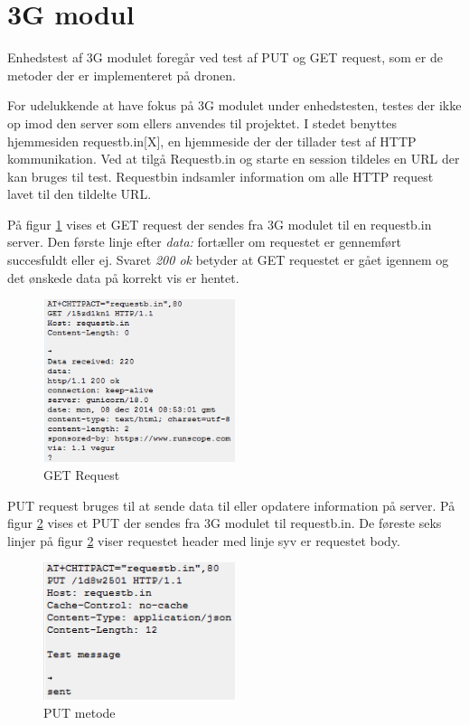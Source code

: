\section{3G modul}

Enhedstest af 3G modulet foregår ved test af PUT og GET request, som er de metoder der er implementeret på dronen.

For udelukkende at have fokus på 3G modulet under enhedstesten, testes der ikke op imod den server som ellers anvendes til projektet. I stedet benyttes hjemmesiden requestb.in[X], en hjemmeside der der tillader test af HTTP kommunikation. Ved at tilgå Requestb.in og starte en session tildeles en URL der kan bruges til test. Requestbin indsamler information om alle HTTP request lavet til den tildelte URL. 

På figur \ref{fig:get_req} vises et GET request der sendes fra 3G modulet til en requestb.in server. Den første linje efter \textit{data:} fortæller om requestet er gennemført succesfuldt eller ej. Svaret \textit{200 ok} betyder at GET requestet er gået igennem og det ønskede data på korrekt vis er hentet. 

\vspace{0.3cm}

\begin{figure}[H]
\centering
\includegraphics[width=0.5\textwidth]{Billeder/Test/get_requestbin.png}
\caption{GET Request}
\label{fig:get_req}
\end{figure}

\newpage

PUT request bruges til at sende data til eller opdatere information på server. 
På figur \ref{fig:putrequest_module} vises et PUT der sendes fra 3G modulet til requestb.in. De føreste seks linjer på figur \ref{fig:putrequest_module} viser requestet header med linje syv er requestet body. 

\begin{figure}[H]
\centering
\includegraphics[width=0.5\textwidth]{Billeder/Test/putrequest_module.png}
\caption{PUT metode}
\label{fig:putrequest_module}
\end{figure}


